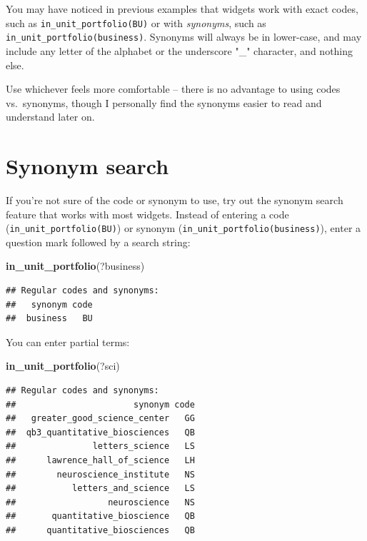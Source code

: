 \documentclass[]{book}
\newenvironment{Shaded}{\begin{snugshade}}{\end{snugshade}}
\newcommand{\KeywordTok}[1]{\textcolor[rgb]{0.13,0.29,0.53}{\textbf{#1}}}
\newcommand{\NormalTok}[1]{#1}
\begin{document}
You may have noticed in previous examples that widgets work with exact codes, such as \texttt{in\_unit\_portfolio(BU)} or with \emph{synonyms}, such as \texttt{in\_unit\_portfolio(business)}. Synonyms will always be in lower-case, and may include any letter of the alphabet or the underscore "\_" character, and nothing else.

Use whichever feels more comfortable -- there is no advantage to using codes vs.~synonyms, though I personally find the synonyms easier to read and understand later on.

\hypertarget{synonym-search}{%
\section{Synonym search}\label{synonym-search}}

If you're not sure of the code or synonym to use, try out the synonym search feature that works with most widgets. Instead of entering a code (\texttt{in\_unit\_portfolio(BU)}) or synonym (\texttt{in\_unit\_portfolio(business)}), enter a question mark followed by a search string:

\begin{Shaded}
\begin{Highlighting}[]
\KeywordTok{in_unit_portfolio}\NormalTok{(?business)}
\end{Highlighting}
\end{Shaded}

\begin{verbatim}
## Regular codes and synonyms:
##   synonym code
##  business   BU
\end{verbatim}

You can enter partial terms:

\begin{Shaded}
\begin{Highlighting}[]
\KeywordTok{in_unit_portfolio}\NormalTok{(?sci)}
\end{Highlighting}
\end{Shaded}

\begin{verbatim}
## Regular codes and synonyms:
##                       synonym code
##   greater_good_science_center   GG
##  qb3_quantitative_biosciences   QB
##               letters_science   LS
##      lawrence_hall_of_science   LH
##        neuroscience_institute   NS
##           letters_and_science   LS
##                  neuroscience   NS
##       quantitative_bioscience   QB
##      quantitative_biosciences   QB
\end{verbatim}
\end{document}
